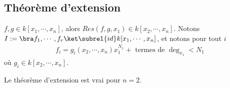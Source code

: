         \subsection{Théorème d'extension}
            $f,g \in k[x_1, \cdots, x_n]$, alors $Res(f,g,x_1) \in k[x_2, \cdots, x_n]$. Notons $I := \bra f_1, \cdots, f_r \ket \subrel{id} k[x_1, \cdots, x_n]$, et notons pour tout $i$
            \begin{align*}
                f_i = g_i(x_2, \cdots, x_n) x_1^{N_1} + \text{ termes de } \deg_{x_1} < N_1
            \end{align*}
            où $g_i \in k[x_2, \cdots, x_n]$.
            \begin{lemm}
                \label{lemm161}
                Le théorème d'extension est vrai pour $n = 2$.
            \end{lemm}
